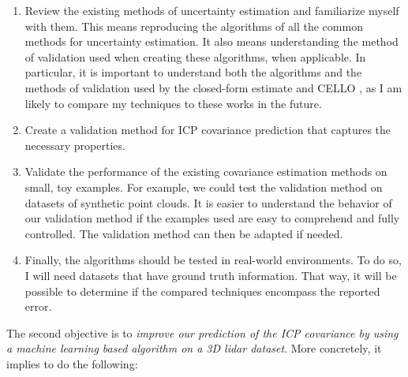 \documentclass[10pt,letterpaper,oneside]{article}
\begin{document}
\begin{enumerate}[{1.}1]
\item Review the existing methods of uncertainty estimation and familiarize myself with them.
  This means reproducing the algorithms of all the common methods for uncertainty estimation.
  It also means understanding the method of validation used when creating these algorithms, when applicable.
  In particular, it is important to understand both the algorithms and the methods of validation used by the closed-form estimate \cite{Censi2007} and \ac{CELLO} \cite{VegaBrown2013}, as I am likely to compare my techniques to these works in the future.
\item Create a validation method for \ac{ICP} covariance prediction that captures the necessary properties.
\item Validate the performance of the existing covariance estimation methods on small, toy examples.
  For example, we could test the validation method on datasets of synthetic point clouds.
  It is easier to understand the behavior of our validation method if the examples used are easy to comprehend and fully controlled.
  The validation method can then be adapted if needed.
\item Finally, the algorithms should be tested in real-world environments.
  To do so, I will need datasets that have ground truth information.
  That way, it will be possible to determine if the compared techniques encompass the reported error.
\end{enumerate} 

The second objective is to \emph{improve our prediction of the \ac{ICP} covariance by using a machine learning based algorithm on a 3D lidar dataset}.
More concretely, it implies to do the following:
\end{document}
